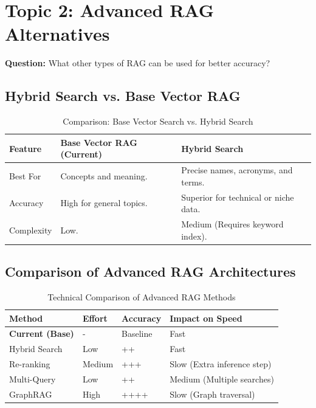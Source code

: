 \documentclass[12pt]{article}
\begin{document}
\newpage

\section{Topic 2: Advanced RAG Alternatives}
\textbf{Question:} What other types of RAG can be used for better accuracy?

\subsection*{Hybrid Search vs. Base Vector RAG}
\begin{table}[h]
\centering
\begin{tabularx}{\textwidth}{@{}l X X@{}}
\toprule
\textbf{Feature} & \textbf{Base Vector RAG (Current)} & \textbf{Hybrid Search} \\ \midrule
Best For & Concepts and meaning. & Precise names, acronyms, and terms. \\
Accuracy & High for general topics. & Superior for technical or niche data. \\
Complexity & Low. & Medium (Requires keyword index). \\ \bottomrule
\end{tabularx}
\caption{Comparison: Base Vector Search vs. Hybrid Search}
\end{table}

\subsection*{Comparison of Advanced RAG Architectures}
\begin{table}[h]
\centering
\begin{tabularx}{\textwidth}{@{}l l l X@{}}
\toprule
\textbf{Method} & \textbf{Effort} & \textbf{Accuracy} & \textbf{Impact on Speed} \\ \midrule
\textbf{Current (Base)} & - & Baseline & Fast \\
Hybrid Search & Low & ++ & Fast \\
Re-ranking & Medium & +++ & Slow (Extra inference step) \\
Multi-Query & Low & ++ & Medium (Multiple searches) \\
GraphRAG & High & ++++ & Slow (Graph traversal) \\ \bottomrule
\end{tabularx}
\caption{Technical Comparison of Advanced RAG Methods}
\end{table}

\newpage
\end{document}
